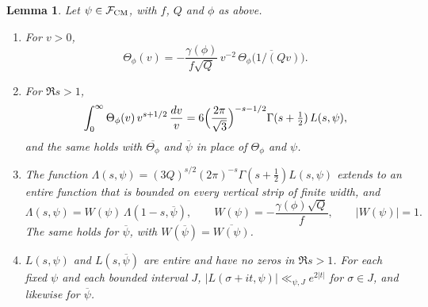 \documentclass[11pt]{article}
\numberwithin{equation}{section}
\newtheorem{lemma}{Lemma}
\begin{document}
\begin{lemma}\label{lem:s2-fe}
Let $\psi\in\mathcal F_{\rm CM}$, with $f$, $Q$ and $\phi$ as above.
\begin{enumerate}
\item[(i)] For $v>0$,
 \begin{equation}\label{eq:d148}
  \Theta_\phi(v)=-\frac{\gamma(\phi)}{f\sqrt Q}\,v^{-2}\,\overline{\Theta_\phi\bigl(1/(Qv)\bigr)} .
 \end{equation}
\item[(ii)] For $\Re s>1$,
 \begin{equation}\label{eq:d149}
  \int_0^\infty\Theta_\phi(v)\,v^{s+1/2}\,\frac{dv}v
  =6\Bigl(\frac{2\pi}{\sqrt3}\Bigr)^{-s-1/2}\Gamma(s+\tfrac12)\,L(s,\psi),
 \end{equation}
 and the same holds with $\overline{\Theta_\phi}$ and $\overline\psi$ in place of $\Theta_\phi$ and $\psi$.
\item[(iii)] The function $\Lambda(s,\psi)=(3Q)^{s/2}(2\pi)^{-s}\Gamma(s+\frac12)L(s,\psi)$ extends to an entire
 function that is bounded on every vertical strip of finite width, and
 \begin{equation}\label{eq:d150}
  \Lambda(s,\psi)=W(\psi)\,\Lambda(1-s,\overline\psi),\qquad
  W(\psi)=-\frac{\gamma(\phi)\sqrt Q}{f},\qquad |W(\psi)|=1 .
 \end{equation}
 The same holds for $\overline\psi$, with $W(\overline\psi)=\overline{W(\psi)}$.
\item[(iv)] $L(s,\psi)$ and $L(s,\overline\psi)$ are entire and have no zeros in $\Re s>1$. For each fixed $\psi$
 and each bounded interval $J$, $|L(\sigma+it,\psi)|\ll_{\psi,J}e^{2|t|}$ for $\sigma\in J$, and likewise for
 $\overline\psi$.
\end{enumerate}
\end{lemma}
\end{document}

